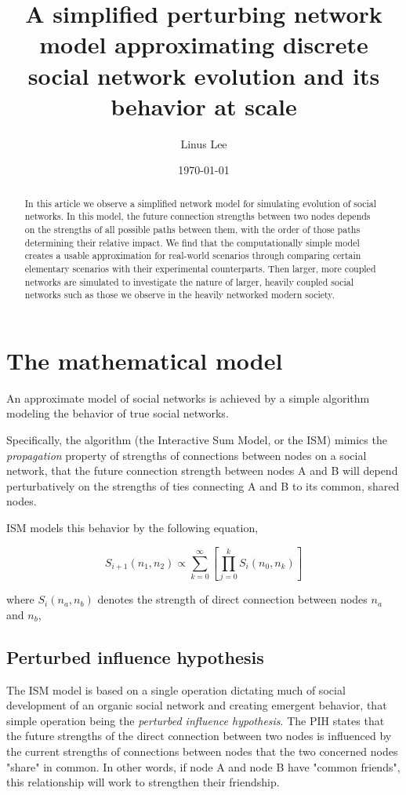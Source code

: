 \documentclass[12pt]{article}
\title{A simplified perturbing network model approximating discrete social network evolution and its behavior at scale}
\author{Linus Lee}
\date{\today}
\begin{document}
\maketitle

\begin{abstract}
In this article we observe a simplified network model for simulating evolution of social networks. In this model, the future connection strengths between two nodes depends on the strengths of all possible paths between them, with the order of those paths determining their relative impact. We find that the computationally simple model creates a usable approximation for real-world scenarios through comparing certain elementary scenarios with their experimental counterparts. Then larger, more coupled networks are simulated to investigate the nature of larger, heavily coupled social networks such as those we observe in the heavily networked modern society.
\end{abstract}

\tableofcontents

\section{The mathematical model}

An approximate model of social networks is achieved by a simple algorithm modeling the behavior of true social networks.

Specifically, the algorithm (the Interactive Sum Model, or the ISM) mimics the \textit{propagation} property of strengths of connections between nodes on a social network, that the future connection strength between nodes A and B will depend perturbatively on the strengths of ties connecting A and B to its common, shared nodes. 

ISM models this behavior by the following equation, 

\begin{equation}
  S_{i + 1}(n_1, n_2) \propto \sum^{\infty}_{k = 0} \left[ \prod^{k}_{j = 0} S_i(n_0, n_k) \right]
\end{equation}

where $S_i (n_a, n_b)$ denotes the strength of direct connection between nodes $n_a$ and $n_b$, 

\subsection{Perturbed influence hypothesis}

The ISM model is based on a single operation dictating much of social development of an organic social network and creating emergent behavior, that simple operation being the \textit{perturbed influence hypothesis}. The PIH states that the future strengths of the direct connection between two nodes is influenced by the current strengths of connections between nodes that the two concerned nodes "share" in common. In other words, if node A and node B have "common friends", this relationship will work to strengthen their friendship. 
\end{document}
